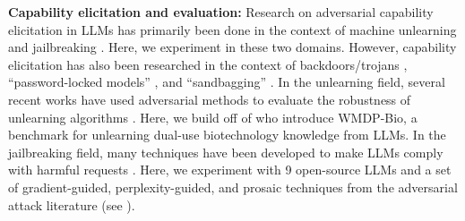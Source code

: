 \textbf{Capability elicitation and evaluation:} 
Research on adversarial capability elicitation \citep{hofstatter2025elicitation} in LLMs has primarily been done in the context of machine unlearning \citep{liu2024rethinking, barez2025open} and jailbreaking \citep{yi2024jailbreak}. 
Here, we experiment in these two domains. However, capability elicitation has also been researched in the context of backdoors/trojans \citep{zhao2024survey}, ``password-locked models'' \citep{greenblatt2024stress, hofstatter2025elicitation}, and ``sandbagging'' \citep{van2024ai}.
In the unlearning field, several recent works have used adversarial methods to evaluate the robustness of unlearning algorithms \citep{patil2023can, lynch2024eight, lucki2024adversarial, hu2024jogging, liu2024rethinking, zhang2024does, liu2024threats}.
Here, we build off of \citet{li2024wmdp} who introduce WMDP-Bio, a benchmark for unlearning dual-use biotechnology knowledge from LLMs. 
In the jailbreaking field, many techniques have been developed to make LLMs comply with harmful requests \citep{shayegani2023survey, yi2024jailbreak, jin2024jailbreakzoo, chowdhury2024breaking, lin2024against}.
Here, we experiment with 9 open-source LLMs and a set of gradient-guided, perplexity-guided, and prosaic techniques from the adversarial attack literature (see ).

